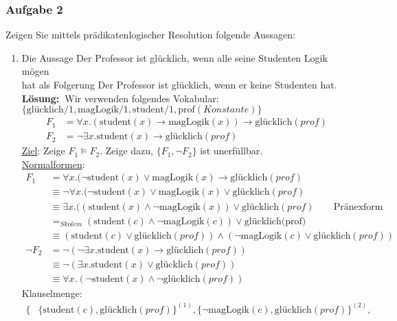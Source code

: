 \documentclass[a4paper,10pt]{article}
\newcommand{\f}[1]{\textbf{#1}}
\newcommand{\LOES}{\f{Lösung:~}}
\begin{document}
\subsubsection*{Aufgabe 2}
Zeigen Sie mittels prädikatenlogischer Resolution folgende Aussagen: 
\begin{enumerate}
\item Die Aussage \glqq Der Professor ist glücklich, wenn alle seine Studenten Logik mögen\grqq \\
hat als Folgerung \glqq Der Professor ist glücklich, wenn er keine Studenten hat\grqq. \\
\LOES Wir verwenden folgendes Vokabular: $\{\text{glücklich}/1, \text{magLogik}/1, \text{student}/1, \text{prof}(Konstante)\}$ 
\begin{align*}
F_1 &= \forall x.(\text{student}(x) \to \text{magLogik}(x)) \to \text{glücklich}(prof) \\
F_2 &= \neg \exists x.\text{student}(x) \to \text{glücklich}(prof)
\end{align*} 
\underline{Ziel}: Zeige $F_1 \models F_2$. Zeige dazu, $\{F_1, \neg F_2\}$ ist unerfüllbar. \\
\underline{Normalformen}: 
\begin{align*}
F_1 &= \forall x.(\neg\text{student}(x) \lor \text{magLogik}(x) \to \text{glücklich}(prof) \\
&\equiv \neg \forall x.(\neg \text{student}(x) \lor \text{magLogik}(x) \lor \text{glücklich}(prof) \\
&\equiv \exists x.((\text{student}(x) \land \neg \text{magLogik}(x)) \lor \text{glücklich}(prof) \qquad \text{Pränexform} \\
&=_{Skolem} (\text{student}(c) \land \neg \text{magLogik}(c)) \lor \text{glücklich(prof)} \\ 
&\equiv (\text{student}(c) \lor \text{glücklich}(prof)) \land (\neg \text{magLogik}(c) \lor \text{glücklich}(prof)) \\
\neg F_2 &= \neg (\neg \exists x.\text{student}(x) \to \text{glücklich}(prof)) \\
&\equiv \neg (\exists x.\text{student}(x) \lor \text{glücklich}(prof)) \\
&\equiv \forall x.(\neg \text{student}(x) \land \neg \text{glücklich}(prof))
\end{align*}
Klauselmenge: 
\begin{align*}
\{&\{\text{student}(c), \text{glücklich}(prof)\}^{(1)}, \{\neg\text{magLogik}(c),\text{glücklich}(prof)\}^{(2)}, \\ 

\end{align*}
\end{enumerate}
\end{document}
